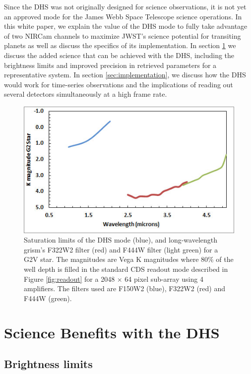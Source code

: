 \documentclass[iop]{emulateapj}
\begin{document}
Since the DHS was not originally designed for science observations, it is not yet an approved mode for the James Webb Space Telescope science operations.
In this white paper, we explain the value of the DHS mode to fully take advantage of two NIRCam channels to maximize JWST's science potential for transiting planets as well as discuss the specifics of its implementation.
In section \ref{sec:addedScience} we discuss the added science that can be achieved with the DHS, including the brightness limits and improved precision in retrieved parameters for a representative system.
In section \ref{sec:implementation}, we discuss how the DHS would work for time-series observations and the implications of reading out several detectors simultaneously at a high frame rate.

\begin{figure}[!b]
\includegraphics[width=1.0\columnwidth]{sat_limits.jpg}
\caption{Saturation limits of the DHS mode (blue), and long-wavelength grism's F322W2 filter (red) and F444W filter (light green) for a G2V star.
The magnitudes are Vega K magnitudes where 80\% of the well depth is filled in the standard CDS readout mode described in Figure \ref{fig:readout}  for a 2048 $\times$ 64 pixel sub-array using 4 amplifiers.
The filters used are F150W2 (blue), F322W2 (red) and F444W (green).}\label{fig:saturationLim}
\end{figure}


\section{Science Benefits with the DHS}\label{sec:addedScience}

\subsection{Brightness limits}\label{sec:brightness}
\end{document}

